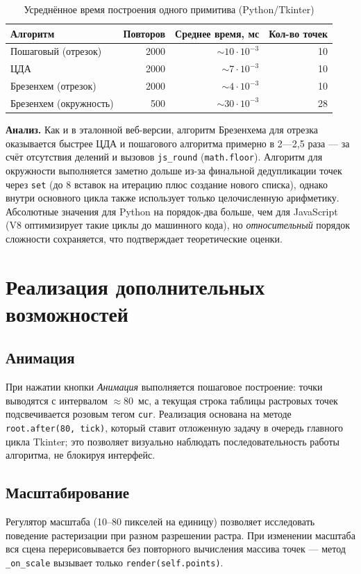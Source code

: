 \documentclass[a4paper,14pt]{extarticle}
\begin{document}
\begin{table}[H]
\centering
\caption{Усреднённое время построения одного примитива (Python/Tkinter)}
\label{tab:timing}
\begin{tabular}{lrrr}
\toprule
Алгоритм & Повторов & Среднее время, мс & Кол-во точек \\
\midrule
Пошаговый (отрезок)        & 2000 & $\sim 10\cdot10^{-3}$ & 10 \\
ЦДА                        & 2000 & $\sim 7\cdot10^{-3}$  & 10 \\
Брезенхем (отрезок)        & 2000 & $\sim 4\cdot10^{-3}$  & 10 \\
Брезенхем (окружность)     & 500  & $\sim 30\cdot10^{-3}$ & 28 \\
\bottomrule
\end{tabular}
\end{table}

\noindent\textbf{Анализ.} Как и в эталонной веб-версии, алгоритм Брезенхема для отрезка оказывается быстрее ЦДА и пошагового алгоритма примерно в 2—2{,}5 раза — за счёт отсутствия делений и вызовов \texttt{js\_round} (\texttt{math.floor}). Алгоритм для окружности выполняется заметно дольше из-за финальной дедупликации точек через \texttt{set} (до 8 вставок на итерацию плюс создание нового списка), однако внутри основного цикла также использует только целочисленную арифметику. Абсолютные значения для Python на порядок-два больше, чем для JavaScript (V8 оптимизирует такие циклы до машинного кода), но \emph{относительный} порядок сложности сохраняется, что подтверждает теоретические оценки.

\section{Реализация дополнительных возможностей}

\subsection{Анимация}
При нажатии кнопки \textit{Анимация} выполняется пошаговое построение: точки выводятся с интервалом $\approx 80$~мс, а текущая строка таблицы растровых точек подсвечивается розовым тегом \texttt{cur}. Реализация основана на методе \texttt{root.after(80, tick)}, который ставит отложенную задачу в очередь главного цикла Tkinter; это позволяет визуально наблюдать последовательность работы алгоритма, не блокируя интерфейс.

\subsection{Масштабирование}
Регулятор масштаба (10–80 пикселей на единицу) позволяет исследовать поведение растеризации при разном разрешении растра. При изменении масштаба вся сцена перерисовывается без повторного вычисления массива точек — метод \texttt{\_on\_scale} вызывает только \texttt{render(self.points)}.
\end{document}
